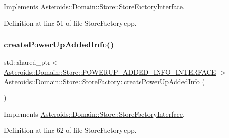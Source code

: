 Implements \hyperlink{classAsteroids_1_1Domain_1_1Store_1_1StoreFactoryInterface_a46a547e9eee1e53a5f423f40ee8ef59e}{Asteroids\+::\+Domain\+::\+Store\+::\+Store\+Factory\+Interface}.



Definition at line 51 of file Store\+Factory.\+cpp.

\mbox{\label{classAsteroids_1_1Domain_1_1Store_1_1StoreFactory_a7c359274ea360991c612b3cdb87df2a2}} 
\subsubsection{\texorpdfstring{create\+Power\+Up\+Added\+Info()}{createPowerUpAddedInfo()}}
{\footnotesize\ttfamily std\+::shared\+\_\+ptr$<$ \hyperlink{classAsteroids_1_1Domain_1_1Store_1_1POWERUP__ADDED__INFO__INTERFACE}{Asteroids\+::\+Domain\+::\+Store\+::\+P\+O\+W\+E\+R\+U\+P\+\_\+\+A\+D\+D\+E\+D\+\_\+\+I\+N\+F\+O\+\_\+\+I\+N\+T\+E\+R\+F\+A\+CE} $>$ Asteroids\+::\+Domain\+::\+Store\+::\+Store\+Factory\+::create\+Power\+Up\+Added\+Info (\begin{DoxyParamCaption}{ }\end{DoxyParamCaption})\hspace{0.3cm}{\ttfamily [virtual]}}



Implements \hyperlink{classAsteroids_1_1Domain_1_1Store_1_1StoreFactoryInterface_a6cac2d91c8da57941879b15c624b2215}{Asteroids\+::\+Domain\+::\+Store\+::\+Store\+Factory\+Interface}.



Definition at line 62 of file Store\+Factory.\+cpp.

\mbox{\label{classAsteroids_1_1Domain_1_1Store_1_1StoreFactory_a5717439d93cf9fd0e799c9dd748804fd}} 
